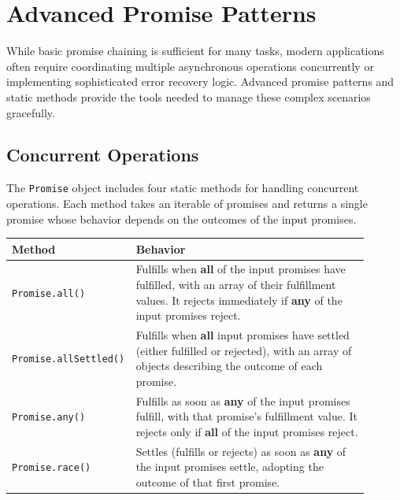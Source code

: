 \documentclass{scrbook}
\begin{document}
\section{Advanced Promise Patterns}

While basic promise chaining is sufficient for many tasks, modern applications often require coordinating multiple asynchronous operations concurrently or implementing sophisticated error recovery logic. Advanced promise patterns and static methods provide the tools needed to manage these complex scenarios gracefully.

\subsection{Concurrent Operations}

The \texttt{Promise} object includes four static methods for handling concurrent operations. Each method takes an iterable of promises and returns a single promise whose behavior depends on the outcomes of the input promises.

\begin{center}
    \begin{tabular}{|p{0.25\linewidth}|p{0.65\linewidth}|} \hline
        Method & Behavior \\ \hline
        
        \texttt{Promise.all()} &
        Fulfills when \textbf{all} of the input promises have fulfilled, with an array of their fulfillment values. It rejects immediately if \textbf{any} of the input promises reject. \\ \hline
        
        \texttt{Promise.allSettled()} &
        Fulfills when \textbf{all} input promises have settled (either fulfilled or rejected), with an array of objects describing the outcome of each promise. \\ \hline
        
        \texttt{Promise.any()} &
        Fulfills as soon as \textbf{any} of the input promises fulfill, with that promise's fulfillment value. It rejects only if \textbf{all} of the input promises reject. \\ \hline
        
        \texttt{Promise.race()} & Settles (fulfills or rejects) as soon as \textbf{any} of the input promises settle, adopting the outcome of that first promise. \\ \hline
    \end{tabular}
\end{center}
\end{document}
